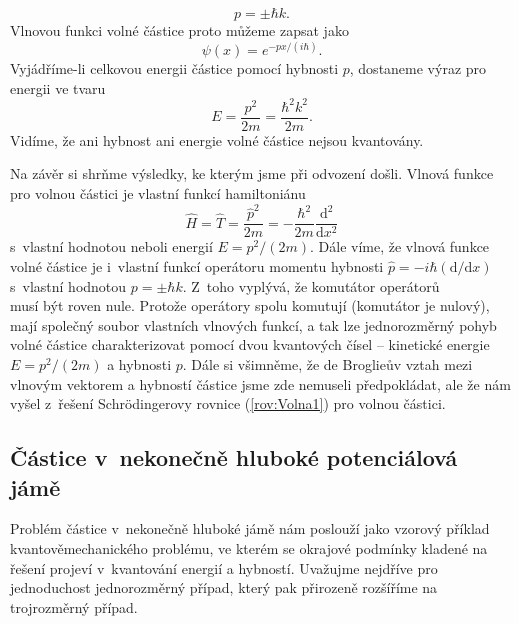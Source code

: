 \begin{equation}
p = \pm \hbar k \mbox{.}
\label{rov:Volna9}
\end{equation}
Vlnovou funkci volné částice proto můžeme zapsat jako
\begin{equation}
\boxed{\psi(x) = e^{-px/(i\hbar)} \mbox{.}}
\label{rov:Volna10}
\end{equation}
Vyjádříme-li celkovou energii částice pomocí hybnosti $p$, dostaneme výraz pro energii ve tvaru
\begin{equation}
\boxed{E = \frac{p^2}{2m} = \frac{\hbar^2k^2}{2m} \mbox{.}}
\label{rov:Volna11}
\end{equation}
Vidíme, že ani hybnost ani energie volné částice nejsou kvantovány.

Na závěr si shrňme výsledky, ke kterým jsme při odvození došli. Vlnová funkce pro volnou částici je vlastní funkcí hamiltoniánu
\begin{equation}
\hat{H} = \hat{T} = \frac{\hat{p}^2}{2m} = -\frac{\hbar^2}{2m}\frac{\mathrm{d}^2}{\mathrm{d}x^2}
\label{rov:Volna12}
\end{equation}
s~vlastní hodnotou neboli energií $E = p^2/(2m)$. Dále víme, že vlnová funkce volné částice je i~vlastní funkcí operátoru momentu hybnosti $\hat{p} = -i\hbar ({\mathrm{d}}/{\mathrm{d}x})$ s~vlastní hodnotou $p = \pm \hbar k$. Z~toho vyplývá, že komutátor operátorů
\begin{equation}
[\hat{T},\hat{p}]
\label{rov:Volna13}
\end{equation}
musí být roven nule. Protože operátory spolu komutují (komutátor je nulový), mají společný soubor vlastních vlnových funkcí, a tak lze jednorozměrný pohyb volné částice charakterizovat pomocí dvou kvantových čísel -- kinetické energie $E = p^2/(2m)$ a hybnosti $p$. Dále si všimněme, že de Broglieův vztah mezi vlnovým vektorem a hybností částice jsme zde nemuseli předpokládat, ale že nám vyšel z~řešení Schrödingerovy rovnice (\ref{rov:Volna1}) pro volnou částici.

\subsection{Částice v~nekonečně hluboké potenciálová jámě}
\label{kap:CasticeJama}

Problém částice v~nekonečně hluboké jámě nám poslouží jako vzorový příklad kvantověmechanického problému, ve kterém se okrajové podmínky kladené na řešení projeví v~kvantování energií a hybností. Uvažujme nejdříve pro jednoduchost jednorozměrný případ, který pak přirozeně rozšíříme na trojrozměrný případ.

